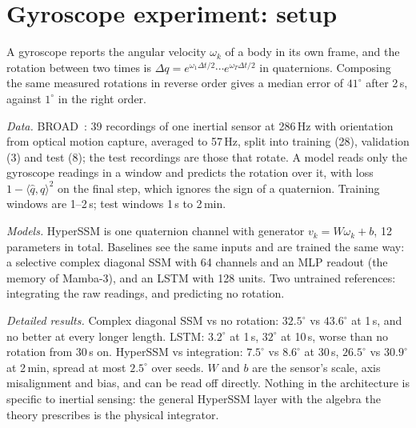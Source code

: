 \documentclass[aps,prx,reprint,superscriptaddress,longbibliography,nofootinbib,floatfix]{revtex4-2}
\theoremstyle{plain}
\theoremstyle{definition}
\begin{document}
\section{Gyroscope experiment: setup}\label{sm:imu}

A gyroscope reports the angular velocity $\omega_k$ of a body in its
own frame, and the rotation between two times is
$\Delta q=e^{\omega_1\Delta t/2}\cdots e^{\omega_T\Delta t/2}$ in
quaternions. Composing the same measured rotations in reverse order gives a
median error of $41^\circ$ after 2\,s, against $1^\circ$ in the right order.

\emph{Data.} BROAD~\cite{broad}: 39 recordings of one inertial
sensor at 286\,Hz with orientation from optical motion capture, averaged to
57\,Hz, split into training (28), validation (3) and test (8); the test
recordings are those that rotate. A model reads only the gyroscope readings
in a window and predicts the rotation over it, with loss
$1-\langle\hat q,q\rangle^2$ on the final step, which ignores the sign of a
quaternion. Training windows are 1--2\,s; test windows 1\,s to 2\,min.

\emph{Models.} HyperSSM is one quaternion channel with generator
$v_k=W\omega_k+b$, 12 parameters in total. Baselines see the same inputs and
are trained the same way: a selective complex diagonal SSM with 64 channels
and an MLP readout (the memory of Mamba-3), and an LSTM with 128 units. Two
untrained references: integrating the raw readings, and predicting no
rotation.

\emph{Detailed results.} Complex diagonal SSM vs no rotation:
$32.5^\circ$ vs $43.6^\circ$ at 1\,s, and no better at every longer length.
LSTM: $3.2^\circ$ at 1\,s, $32^\circ$ at 10\,s, worse than no rotation from
30\,s on. HyperSSM vs integration: $7.5^\circ$ vs $8.6^\circ$ at 30\,s,
$26.5^\circ$ vs $30.9^\circ$ at 2\,min, spread at most $2.5^\circ$ over
seeds. $W$ and $b$ are the sensor's scale, axis misalignment and bias, and
can be read off directly. Nothing in the architecture is specific to
inertial sensing: the general HyperSSM layer with the algebra the theory
prescribes is the physical integrator.

\end{document}
